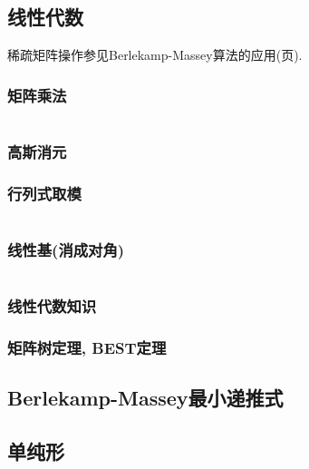 \documentclass[a4paper, twoside]{article}
\begin{document}
\begin{multicols}{2}
			\subsection{线性代数}
				稀疏矩阵操作参见Berlekamp-Massey算法的应用(\pageref{BerlekampMasseyApplication}页).

				\subsubsection{矩阵乘法}
					\inputminted{cpp}{../src/math/矩阵乘法.cpp}

				\subsubsection{高斯消元}
					

				\subsubsection{行列式取模}
					\inputminted{cpp}{../src/math/行列式取模.cpp}



				\subsubsection{线性基(消成对角)}
					\inputminted{cpp}{../src/math/线性基.cpp}

				\subsubsection{线性代数知识}
					
				
				\subsubsection{矩阵树定理, BEST定理}
					
			
			\subsection{Berlekamp-Massey最小递推式}
				

			\subsection{单纯形}
				\inputminted{cpp}{../src/math/单纯形.cpp}


\end{multicols}
\end{document}
